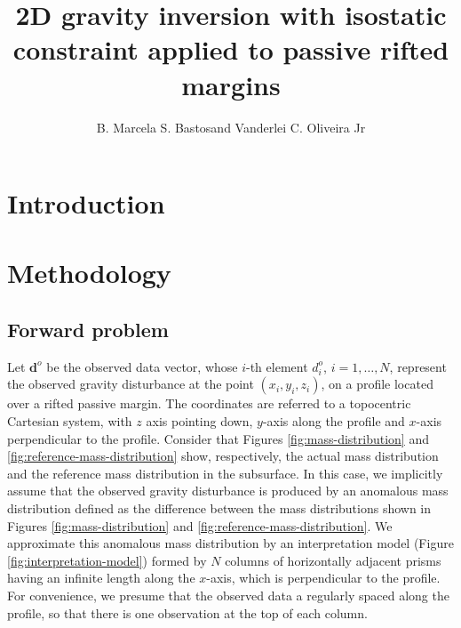\documentclass[manuscript]{geophysics}
\begin{document}
\title{2D gravity inversion with isostatic constraint applied to passive rifted margins}

\renewcommand{\thefootnote}{\fnsymbol{footnote}} 


\address{
\footnotemark[1]Observat\'{o}rio Nacional, \\
Department of Geophysics, \\
Rio de Janeiro, Brazil}
\author{B. Marcela S. Bastos\footnotemark[1] and Vanderlei C. Oliveira Jr\footnotemark[1]}


\maketitle

\begin{abstract}

\lipsum[1]

\end{abstract}

\section{Introduction}

\lipsum[1-5]

\section{Methodology}


\subsection{Forward problem}

Let $\mathbf{d}^{o}$ be the observed data vector, whose $i$-th element $d^{o}_{i}$, 
$i = 1, \dots, N$, represent the observed gravity disturbance at the point 
$(x_{i}, y_{i}, z_{i})$, on a profile located over a rifted passive margin. The
coordinates are referred to a topocentric Cartesian system, with $z$ axis pointing
down, $y$-axis along the profile and $x$-axis perpendicular to the profile. Consider
that Figures \ref{fig:mass-distribution} and \ref{fig:reference-mass-distribution} 
show, respectively, the actual mass distribution and the reference mass 
distribution in the subsurface. In this case, we implicitly assume that the 
observed gravity disturbance is produced by an anomalous mass distribution defined 
as the difference between the mass distributions shown in Figures 
\ref{fig:mass-distribution} and \ref{fig:reference-mass-distribution}. We 
approximate this anomalous mass distribution by an interpretation model 
(Figure  \ref{fig:interpretation-model}) formed by $N$ columns of horizontally 
adjacent prisms having an infinite length along the $x$-axis, which is 
perpendicular to the profile. For convenience, we presume that 
the observed data a regularly spaced along the profile, so that there is one 
observation at the top of each column.
\end{document}
